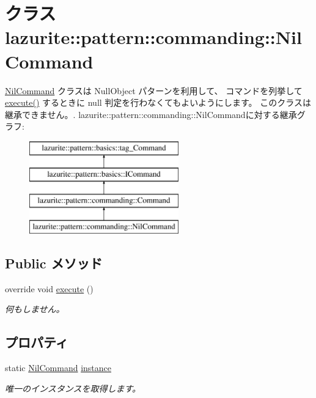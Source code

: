 \hypertarget{classlazurite_1_1pattern_1_1commanding_1_1_nil_command}{
\section{クラス lazurite::pattern::commanding::NilCommand}
\label{classlazurite_1_1pattern_1_1commanding_1_1_nil_command}
}


\hyperlink{classlazurite_1_1pattern_1_1commanding_1_1_nil_command}{NilCommand} クラスは NullObject パターンを利用して、 コマンドを列挙して \hyperlink{classlazurite_1_1pattern_1_1commanding_1_1_nil_command_a1e4264d6178861597779826267d5ac4c}{execute()} するときに null 判定を行わなくてもよいようにします。 このクラスは継承できません。.  
lazurite::pattern::commanding::NilCommandに対する継承グラフ:\begin{figure}[H]
\begin{center}
\leavevmode
\includegraphics[height=4cm]{classlazurite_1_1pattern_1_1commanding_1_1_nil_command}
\end{center}
\end{figure}
\subsection*{Public メソッド}
\begin{DoxyCompactItemize}
\item 
override void \hyperlink{classlazurite_1_1pattern_1_1commanding_1_1_nil_command_a1e4264d6178861597779826267d5ac4c}{execute} ()
\begin{DoxyCompactList}\small\item\em 何もしません。 \item\end{DoxyCompactList}\end{DoxyCompactItemize}
\subsection*{プロパティ}
\begin{DoxyCompactItemize}
\item 
static \hyperlink{classlazurite_1_1pattern_1_1commanding_1_1_nil_command}{NilCommand} \hyperlink{classlazurite_1_1pattern_1_1commanding_1_1_nil_command_ae926216e2d1dd8802f946a4423adea04}{instance}
\begin{DoxyCompactList}\small\item\em 唯一のインスタンスを取得します。 \item\end{DoxyCompactList}\end{DoxyCompactItemize}


